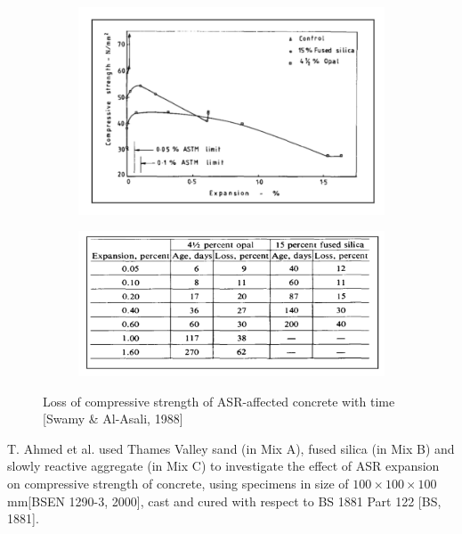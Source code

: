 \begin{figure}[h!]
\centering
\begin{subfigure}{.8\textwidth}
  \centering
  \includegraphics[width=1.0\linewidth]{Reference/temp5.png}
\end{subfigure}
\begin{subfigure}{.8\textwidth}
  \centering
  \includegraphics[width=1.0\linewidth]{Reference/temp6.png}
\end{subfigure}
\caption{Loss of compressive strength of ASR-affected concrete with time [Swamy \& Al-Asali, 1988\cite{Swamy}]}
\label{Swamy, Al-Asali, 1988 2}
\end{figure}

\clearpage
T. Ahmed et al.\cite{Ahmed} used Thames Valley sand (in Mix A), fused silica (in Mix B) and slowly reactive aggregate (in Mix C) to investigate the effect of ASR expansion on compressive strength of concrete, using specimens in size of $100 \times 100 \times 100$ mm[BSEN 1290-3, 2000], cast and cured with respect to BS 1881 Part 122 [BS, 1881].

